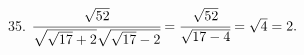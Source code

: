 35. $\cfrac{\sqrt{52}}{\sqrt{\sqrt{17}+2}\sqrt{\sqrt{17}-2}}=\cfrac{\sqrt{52}}{\sqrt{17-4}}=\sqrt{4}=2.$\\
